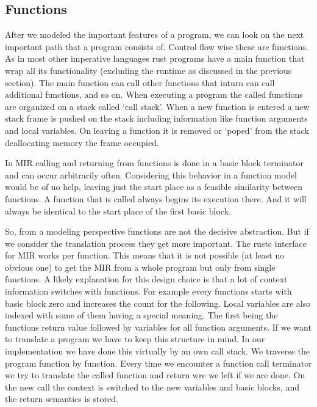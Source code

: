 \subsection{Functions}
After we modeled the important features of a program, we can look on the next important path that a program consists of.
Control flow wise these are functions.
As in most other imperative languages rust programs have a main function that wrap all its functionality (excluding the runtime as discussed in the previous section).
The main function can call other functions that inturn can call additional functions, and so on.
When executing a program the called functions are organized on a stack called `call stack'.
When a new function is entered a new stack frame is pushed on the stack including information like function arguments and local variables.
On leaving a function it is removed or `poped' from the stack deallocating memory the frame occupied.

In MIR calling and returning from functions is done in a basic block terminator and can occur arbitrarily often.
Considering this behavior in a function model would be of no help, leaving just the start place as a feasible similarity between functions.
A function that is called always begins its execution there.
And it will always be identical to the start place of the first basic block.

So, from a modeling perspective functions are not the decisive abstraction.
But if we consider the translation process they get more important.
The rustc interface for MIR works per function.
This means that it is not possible (at least no obvious one) to get the MIR from a whole program but only from single functions.
A likely explanation for this design choice is that a lot of context information switches with functions.
For example every functions starts with basic block zero and increases the count for the following.
Local variables are also indexed with some of them having a special meaning.
The first being the functions return value followed by variables for all function arguments.
If we want to translate a program we have to keep this structure in mind.
In our implementation we have done this virtually by an own call stack.
We traverse the program function by function.
Every time we encounter a function call terminator we try to translate the called function and return wre we left if we are done.
On the new call the context is switched to the new variables and basic blocks, and the return semantics is stored.

